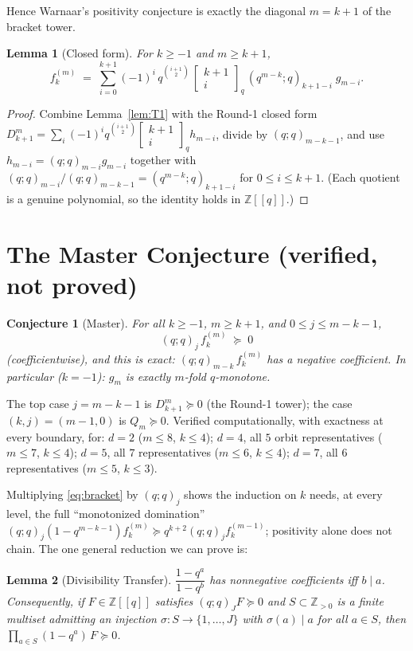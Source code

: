 \documentclass[11pt]{article}
\newtheorem{lemma}{Lemma}
\newtheorem{conjecture}{Conjecture}
\newcommand{\qbin}[2]{\begin{bmatrix}#1\\#2\end{bmatrix}_q}
\begin{document}
Hence Warnaar's positivity conjecture is exactly the diagonal $m=k+1$ of the
bracket tower.

\begin{lemma}[Closed form]
For $k\ge -1$ and $m\ge k+1$,
\[
f_k^{(m)} \;=\; \sum_{i=0}^{k+1} (-1)^i\, q^{\binom{i+1}{2}}\,
   \qbin{k+1}{i}\, (q^{m-k};q)_{k+1-i}\; g_{m-i}.
\]
\end{lemma}

\begin{proof}
Combine Lemma~\ref{lem:T1} with the Round-1 closed form
$D_{k+1}^m=\sum_i(-1)^i q^{\binom{i+1}{2}}\qbin{k+1}{i}h_{m-i}$, divide by
$(q;q)_{m-k-1}$, and use $h_{m-i}=(q;q)_{m-i}g_{m-i}$ together with
$(q;q)_{m-i}/(q;q)_{m-k-1}=(q^{m-k};q)_{k+1-i}$ for $0\le i\le k+1$.
(Each quotient is a genuine polynomial, so the identity holds in
$\mathbb{Z}[[q]]$.)
\end{proof}

\section{The Master Conjecture (verified, not proved)}

\begin{conjecture}[Master]
For all $k\ge -1$, $m\ge k+1$, and $0\le j\le m-k-1$,
\[
(q;q)_j\, f_k^{(m)} \;\succeq\; 0
\]
(coefficientwise), and this is \emph{exact}: $(q;q)_{m-k}\,f_k^{(m)}$ has a
negative coefficient. In particular ($k=-1$): $g_m$ is exactly $m$-fold
$q$-monotone.
\end{conjecture}

The top case $j=m-k-1$ is $D_{k+1}^m\succeq 0$ (the Round-1 tower); the case
$(k,j)=(m-1,0)$ is $Q_m\succeq 0$. Verified computationally, with exactness at
every boundary, for: $d=2$ ($m\le 8$, $k\le 4$); $d=4$, all $5$ orbit
representatives ($m\le 7$, $k\le 4$); $d=5$, all $7$ representatives
($m\le 6$, $k\le 4$); $d=7$, all $6$ representatives ($m\le 5$, $k\le 3$).

Multiplying \eqref{eq:bracket} by $(q;q)_j$ shows the induction on $k$ needs,
at every level, the full ``monotonized domination''
$(q;q)_j(1-q^{m-k-1})f_k^{(m)}\succeq q^{k+2}(q;q)_j f_k^{(m-1)}$; positivity
alone does not chain. The one general reduction we can prove is:

\begin{lemma}[Divisibility Transfer]
$\dfrac{1-q^a}{1-q^b}$ has nonnegative coefficients iff $b\mid a$.
Consequently, if $F\in\mathbb{Z}[[q]]$ satisfies $(q;q)_J F\succeq 0$ and
$S\subset\mathbb{Z}_{>0}$ is a finite multiset admitting an injection
$\sigma\colon S\to\{1,\dots,J\}$ with $\sigma(a)\mid a$ for all $a\in S$, then
$\prod_{a\in S}(1-q^a)\,F\succeq 0$.
\end{lemma}
\end{document}
